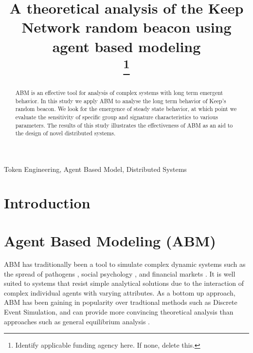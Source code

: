 \documentclass[conference]{IEEEtran}
\begin{document}
\title{A theoretical analysis of the Keep Network random beacon using agent based modeling \\
\thanks{Identify applicable funding agency here. If none, delete this.}
}

\author{

\and
{}

\and
{}

\and
{}
}

\maketitle

\begin{abstract}
    ABM is an effective tool for analysis of complex systems with long term 
    emergent behavior. In this study we apply ABM to analyse the long term 
    behavior of Keep’s random beacon. We look for the emergence of steady 
    state behavior, at which point we evaluate the sensitivity of specific 
    group and signature characteristics to various parameters. The results 
    of this study illustrates the effectiveness of ABM as an aid to the design 
    of novel distributed systems. 

\end{abstract}

\begin{IEEEkeywords}
Token Engineering, Agent Based Model, Distributed Systems
\end{IEEEkeywords}

\section{Introduction}

\section{Agent Based Modeling (ABM)}
ABM has traditionally been a tool to simulate complex dynamic systems 
such as the spread of pathogens \cite{Bauer2009}, social psychology 
\cite{Smith2007}, and financial markets \cite{Feng2012}. It is well suited
to systems that resist simple analytical solutions due to the interaction of 
complex individual agents with varying attributes. As a bottom up approach, ABM
has been gaining in popularity over tradtional methods such as Discrete Event
Simulation, and can provide more convincing theoretical analysis than approaches
such as general equilibrium analysis \cite{Wang2018}.
\end{document}
